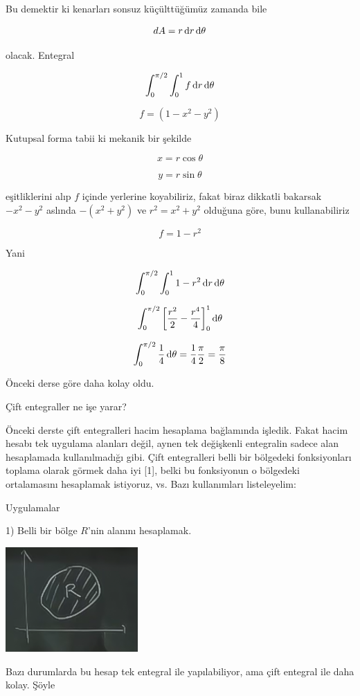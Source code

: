 \documentclass[12pt,fleqn]{article}\usepackage{../../common}
\begin{document}
Bu demektir ki kenarları sonsuz küçülttüğümüz zamanda bile 

$$ dA = r \,\mathrm{d} r \,\mathrm{d} \theta $$

olacak. Entegral

$$ \int_0^{\pi/2} \int_0^1  f \,\mathrm{d} r \,\mathrm{d} \theta$$

$$ f =  (1-x^2-y^2)$$

Kutupsal forma tabii ki mekanik bir şekilde

$$ x = r\cos\theta $$

$$ y = r\sin\theta $$

eşitliklerini alıp $f$ içinde yerlerine koyabiliriz, fakat biraz dikkatli
bakarsak $-x^2-y^2$ aslında $-(x^2+y^2)$ ve $r^2=x^2+y^2$ olduğuna göre, bunu
kullanabiliriz

$$ f =   1-r^2 $$

Yani

$$ \int_0^{\pi/2} \int_0^1  1-r^2 \,\mathrm{d} r \,\mathrm{d} \theta$$

$$ \int_0^{\pi/2}  \bigg[ \frac{r^2}{2} - \frac{r^4}{4} \bigg]_0^1 \,\mathrm{d} \theta$$

$$
\int_0^{\pi/2} \frac{1}{4} \,\mathrm{d} \theta =
\frac{1}{4} \frac{\pi}{2} = \frac{\pi}{8}
$$

Önceki derse göre daha kolay oldu. 

Çift entegraller ne işe yarar? 

Önceki derste çift entegralleri hacim hesaplama bağlamında işledik. Fakat
hacim hesabı tek uygulama alanları değil, aynen tek değişkenli entegralin
sadece alan hesaplamada kullanılmadığı gibi. Çift entegralleri
belli bir bölgedeki fonksiyonları toplama olarak görmek daha iyi [1], belki bu
fonksiyonun o bölgedeki ortalamasını hesaplamak istiyoruz, vs. Bazı
kullanımları listeleyelim:

Uygulamalar 

1) Belli bir bölge $R$'nin alanını hesaplamak. 

\includegraphics[height=4cm]{17_3.png}

Bazı durumlarda bu hesap tek entegral ile yapılabiliyor, ama çift entegral ile
daha kolay. Şöyle
\end{document}
